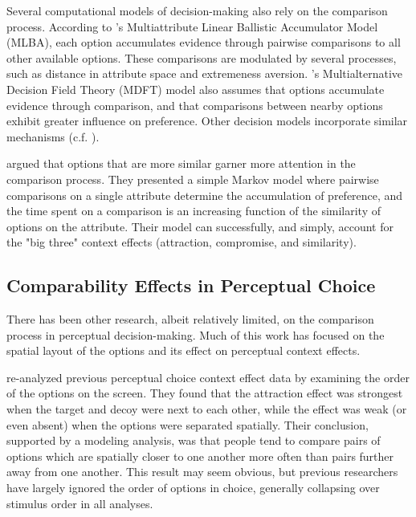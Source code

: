 Several computational models of decision-making also rely on the comparison process. According to \textcite{trueblood2014multiattribute}'s Multiattribute Linear Ballistic Accumulator Model (MLBA), each option accumulates evidence through pairwise comparisons to all other available options. These comparisons are modulated by several processes, such as distance in attribute space and extremeness aversion. \textcite{roeMultialternativeDecisionField2001a}'s Multialternative Decision Field Theory (MDFT) model also assumes that options accumulate evidence through comparison, and that comparisons between nearby options exhibit greater influence on preference. Other decision models incorporate similar mechanisms \parencite{usherLossAversionInhibition2004a,noguchiMultialternativeDecisionSampling2018a,wollschlager2NaryChoiceTree2012a,landry2021pairwise} (c.f. \textcite{bhatiaAssociationsAccumulationPreference2013b,bergnerVAMPVotingAgent2019b}). 

\textcite{trueblood2022attentional} argued that options that are more similar garner more attention in the comparison process. They presented a simple Markov model where pairwise comparisons on a single attribute determine the accumulation of preference, and the time spent on a comparison is an increasing function of the similarity of options on the attribute. Their model can successfully, and simply, account for the "big three" context effects (attraction, compromise, and similarity).

\subsection{Comparability Effects in Perceptual Choice}
There has been other research, albeit relatively limited, on the comparison process in perceptual decision-making. Much of this work has focused on the spatial layout of the options and its effect on perceptual context effects.

\textcite{trueblood2022attentional} re-analyzed previous perceptual choice context effect data \parencite{trueblood2015fragile} by examining the order of the options on the screen. They found that the attraction effect was strongest when the target and decoy were next to each other, while the effect was weak (or even absent) when the options were separated spatially. Their conclusion, supported by a modeling analysis, was that people tend to compare pairs of options which are spatially closer to one another more often than pairs further away from one another. This result may seem obvious, but previous researchers have largely ignored the order of options in choice, generally collapsing over stimulus order in all analyses.

